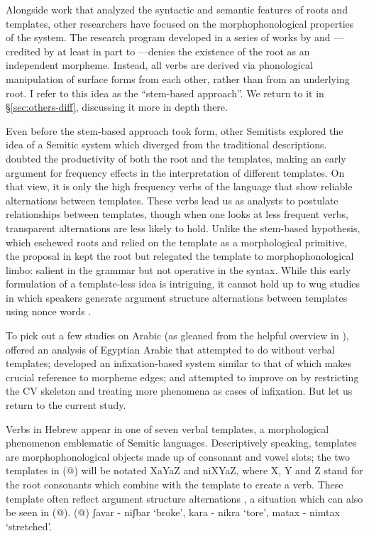 Alongside work that analyzed the syntactic and semantic features of roots and templates, other researchers have focused on the morphophonological properties of the system. The research program developed in a series of works by \cite{batel89,batel94} and \cite{ussishkin00phd,ussishkin05}---credited by \cite{ussishkin00phd} at least in part to \cite{horvath81}---denies the existence of the root as an independent morpheme. Instead, all verbs are derived via phonological manipulation of surface forms from each other, rather than from an underlying root. I refer to this idea as the ``stem-based approach''. We return to it in \S\ref{sec:others-diff}, discussing it more in depth there.

Even before the stem-based approach took form, other Semitists explored the idea of a Semitic system which diverged from the traditional descriptions. \cite{schwarzwald73} doubted the productivity of both the root and the templates, making an early argument for frequency effects in the interpretation of different templates. On that view, it is only the high frequency verbs of the language that show reliable alternations between templates. These verbs lead us as analysts to postulate relationships between templates, though when one looks at less frequent verbs, transparent alternations are less likely to hold. Unlike the stem-based hypothesis, which eschewed roots and relied on the template as a morphological primitive, the proposal in \cite{schwarzwald73} kept the root but relegated the template to morphophonological limbo: salient in the grammar but not operative in the syntax. While this early formulation of a template-less idea is intriguing, it cannot hold up to wug studies in which speakers generate argument structure alternations between templates using nonce words \citep{berman93jcl,moorecantwell13}.

To pick out a few studies on Arabic (as gleaned from the helpful overview in \citealt{ussishkin00phd}), \cite{darden92} offered an analysis of Egyptian Arabic that attempted to do without verbal templates; \cite{mcomber95} developed an infixation-based system similar to that of \cite{jjmcc81} which makes crucial reference to morpheme edges; and \cite{ratcliffe97,ratcliffe98} attempted to improve on \cite{jjmccprince90} by restricting the CV skeleton and treating more phenomena as cases of infixation. But let us return to the current study.





Verbs in Hebrew appear in one of seven verbal templates, a morphological phenomenon emblematic of Semitic languages. Descriptively speaking, templates are morphophonological objects made up of consonant and vowel slots; the two templates in (@) will be notated XaYaZ and niXYaZ, where X, Y and Z stand for the root consonants which combine with the template to create a verb. These template often reflect argument structure alternations \citep{doron03,arad05,kastner16phd,kastner17gjgl}, a situation which can also be seen in (@).
(@) ʃavar - niʃbar ‘broke’, kara - nikra ‘tore’, matax - nimtax ‘stretched’.

